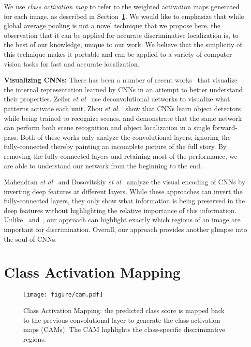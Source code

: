 \documentclass[10pt,twocolumn,letterpaper]{article}
\begin{document}
We use \textit{class activation map} to refer to the weighted activation maps generated for each image, as described in Section~\ref{sec:cam}. We would like to emphasize that while global average pooling is not a novel technique that we propose here, the observation that it can be applied for accurate discriminative localization is, to the best of our knowledge, unique to our work. We believe that the simplicity of this technique makes it portable and can be applied to a variety of computer vision tasks for fast and accurate localization.

\textbf{Visualizing CNNs:} There has been a number of recent works~\cite{zeiler2014visualizing,mahendran2004understanding,dosovitskiy2015inverting,zhou2014object} that visualize the internal representation learned by CNNs in an attempt to better understand their properties. Zeiler \textit{et al}~\cite{zeiler2014visualizing} use deconvolutional networks to visualize what patterns activate each unit. Zhou \textit{et al.}~\cite{zhou2014object} show that CNNs learn object detectors while being trained to recognize scenes, and demonstrate that the same network can perform both scene recognition and object localization in a single forward-pass. Both of these works only analyze the convolutional layers, ignoring the fully-connected thereby painting an incomplete picture of the full story. By removing the fully-connected layers and retaining most of the performance, we are able to understand our network from the beginning to the end. 

Mahendran \textit{et al}~\cite{mahendran2004understanding} and Dosovitskiy \textit{et al}~\cite{dosovitskiy2015inverting} analyze the visual encoding of CNNs by inverting deep features at different layers. While these approaches can invert the fully-connected layers, they only show what information is being preserved in the deep features without highlighting the relative importance of this information. Unlike~\cite{mahendran2004understanding} and~\cite{dosovitskiy2015inverting}, our approach  can highlight exactly which regions of an image are important for discrimination. Overall, our approach provides another glimpse into the soul of CNNs.





\section{Class Activation Mapping}
\label{sec:cam}

\begin{figure*}
\texttt{[image: figure/cam.pdf]}
 \caption{Class Activation Mapping: the predicted class score is mapped back to the previous convolutional layer to generate the class activation maps (CAMs). The CAM highlights the class-specific discriminative regions.}\label{figure_module}
\end{figure*}
\end{document}
